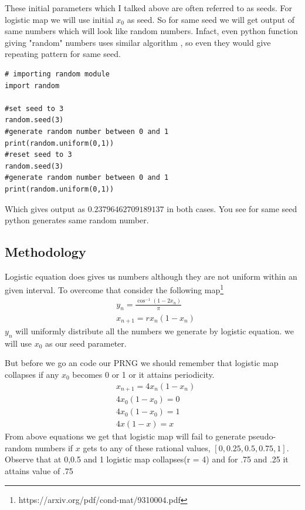 \documentclass{report}
\begin{document}
These initial parameters which I talked above are often referred to as seeds. For logistic map we will use initial $x_0$ as seed. So for same seed we will get output of same  numbers which will look like random numbers. Infact, even python function giving "random" numbers uses similar algorithm , so even they would give repeating pattern for same seed.

\begin{lstlisting}
# importing random module
import random

#set seed to 3
random.seed(3)
#generate random number between 0 and 1
print(random.uniform(0,1))
#reset seed to 3
random.seed(3)
#generate random number between 0 and 1
print(random.uniform(0,1))
\end{lstlisting}

Which gives output as $0.23796462709189137$ in both cases. You see for same seed python generates same random number.
\newpage

\subsection{Methodology}
Logistic equation does gives us numbers although they are not uniform within an given interval. To overcome that consider the following map\footnote[1]{https://arxiv.org/pdf/cond-mat/9310004.pdf}
\begin{align}
    &y_n = \frac{\cos^{-1}(1-2x_n)}{\pi}  \\
    &x_{n+1} = rx_n(1-x_n) \nonumber
\end{align}
$y_n$ will uniformly distribute all the numbers we generate by logistic equation. we will use $x_0$ as our seed parameter.

But before we go an code our PRNG we should remember that logistic map collapses if any $x_0$ becomes 0 or 1 or it attains periodicity.
\begin{align}
    &x_{n+1} = 4x_n(1-x_n) \nonumber \\
    &4x_0(1-x_0) = 0 \nonumber \\
    &4x_0(1-x_0) = 1 \nonumber \\
    &4x(1-x) = x \nonumber
\end{align}
From above equations we get that logistic map will fail to generate pseudo-random numbers if $x$ gets to any of these rational values, $[0 , 0.25 , 0.5 , 0.75 , 1 ]$. Observe that at 0,0.5 and 1 logistic map collapses(r = 4) and for .75 and .25 it attains value of .75
\end{document}

